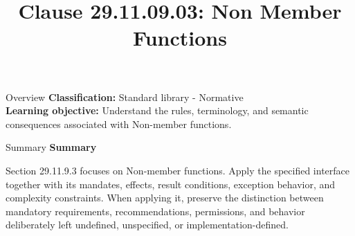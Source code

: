 \documentclass[10pt,letterpaper]{article}
\title{Clause 29.11.09.03: Non Member Functions}
\author{}
\date{}
\begin{document}
\maketitle
\begin{CornellOverviewBox}{Overview}
\textbf{Classification:} Standard library - Normative\\[2pt]
\textbf{Learning objective:} Understand the rules, terminology, and semantic consequences associated with Non-member functions.
\end{CornellOverviewBox}\begin{CornellSummaryBox}{Summary}
{\sffamily\bfseries\color{Accent} Summary}\par\vspace{3pt}Section 29.11.9.3 focuses on Non-member functions. Apply the specified interface together with its mandates, effects, result conditions, exception behavior, and complexity constraints. When applying it, preserve the distinction between mandatory requirements, recommendations, permissions, and behavior deliberately left undefined, unspecified, or implementation-defined.
\end{CornellSummaryBox}
\end{document}

